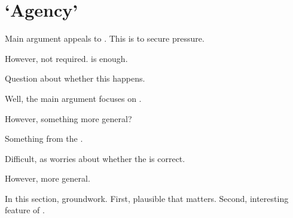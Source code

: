 \chapter{`Agency'}
\label{cha:embed}

\begin{note}
  Main argument appeals to \tCV{}.
  This is to secure pressure.

  However, not required.
  \requ{} is enough.

  Question about whether this happens.
\end{note}

\begin{note}
  Well, the main argument focuses on \tCV{}.

  However, something more general?

  Something from the \agpe{}.

  Difficult, as worries about whether the \agpe{} is correct.

  However, more general.

  In this section, groundwork.
  First, plausible that \agpe{} matters.
  Second, interesting feature of \requ{}.
\end{note}

\section{}
\label{sec:infl}

